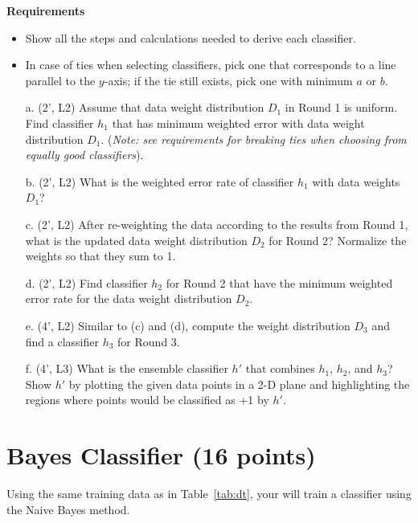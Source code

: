 \documentclass[12pt,letterpaper]{article}
\begin{document}
				\textbf{Requirements}
				\begin{itemize}
					\item Show all the steps and calculations needed to derive each classifier.
					\item In case of ties when selecting classifiers, pick one that corresponds to a line parallel to the $y$-axis; if the tie still exists, pick one with minimum $a$ or $b$.
				\end{itemize}
				
				\begin{itemize}
					\item[a.] (2', L2) Assume that data weight distribution $D_1$ in Round 1 is uniform. Find classifier $h_1$ that has minimum weighted error with data weight distribution $D_1$. ({\it Note: see requirements for breaking ties when choosing from equally good classifiers}).
					\item[b.] (2', L2) What is the weighted error rate of classifier $h_1$ with data weights $D_1$?
					\item[c.] (2', L2) After re-weighting the data according to the results from Round 1, what is the updated data weight distribution $D_2$ for Round 2? Normalize the weights so that they sum to 1.
					\item[d.] (2', L2) Find classifier $h_2$ for Round 2 that have the minimum weighted error rate for the data weight distribution $D_2$.
					\item[e.] (4', L2) Similar to (c) and (d), compute the weight distribution $D_3$ and find a classifier $h_3$ for Round 3.
					\item[f.] (4', L3) What is the ensemble classifier $h'$ that combines $h_1$, $h_2$, and $h_3$? Show $h'$ by plotting the given data points in a 2-D plane and highlighting the regions where points would be classified as +1 by $h'$.
				\end{itemize}
				
				\section{Bayes Classifier (16 points)}
				Using the same training data as in Table~\ref{tab:dt}, your will train a classifier using the Naive Bayes method.\\
				
\end{document}
